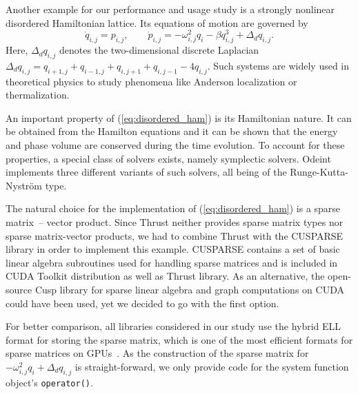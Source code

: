 \documentclass[final]{siamltex}
\newcommand{\code}[1]{\lstinline|#1|}
\newcommand{\eqref}[1]{(\ref{#1})}
\begin{document}
Another example for our performance and usage study is a strongly
nonlinear disordered Hamiltonian lattice. Its equations of motion are
governed by
\begin{equation}
\dot{q}_{i,j} = p_{i,j}, \quad \quad
\dot{p}_{i,j} = - \omega_{i,j}^2 q_i - \beta q_{i,j}^3 + \Delta_d q_{i,j}.
\label{eq:disordered_ham}
\end{equation}
Here, $\Delta_d q_{i,j}$ denotes the two-dimensional discrete Laplacian
$\Delta_d
q_{i,j}=q_{i+1,j}+q_{i-1,j}+q_{i,j+1}+q_{i,j-1}-4q_{i,j}$. Such
systems are widely used in theoretical physics to study phenomena
like Anderson localization or thermalization.  %

An important property of \eqref{eq:disordered_ham} is its Hamiltonian
nature. It can be obtained from the Hamilton equations and it can be shown that the energy and
phase volume are conserved during the time evolution. To account for
these properties, a special class of solvers exists, namely symplectic
solvers. Odeint implements three different variants of such solvers,
all being of the Runge-Kutta-Nystr\"om type.



The natural choice for the implementation of \eqref{eq:disordered_ham} is a
sparse matrix~-- vector product. Since Thrust neither provides sparse
matrix types nor sparse matrix-vector products, we had to combine
Thrust with the CUSPARSE library in order to implement this example. CUSPARSE    %
contains a set of basic linear algebra subroutines used for handling sparse
matrices and is included in CUDA Toolkit distribution as well as Thrust
library. As an alternative, the open-source Cusp library \cite{CuspRef} for sparse linear algebra
and graph computations on CUDA could have been used, yet we decided to go with the first option.

For better comparison, all libraries considered in our study use the hybrid
ELL format for storing the sparse matrix, which is one of the most efficient
formats for sparse matrices on GPUs~\cite{BellGarland2008}.
As the construction of the sparse matrix for $- \omega_{i,j}^2 q_i + \Delta_d q_{i,j}$ is
straight-forward, we only provide code for the system function object's
\code{operator()}.
\end{document}
